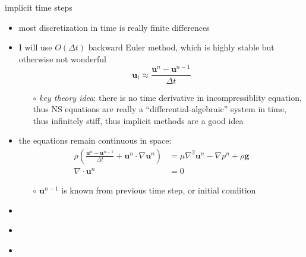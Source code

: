 \documentclass[10pt,hyperref]{beamer}
\newcommand{\bg}{\mathbf{g}}
\newcommand{\bu}{\mathbf{u}}
\newcommand{\grad}{\nabla}
\newcommand{\Div}{\nabla\cdot}
\begin{document}
\begin{frame}{implicit time steps}

\begin{itemize}
\item most discretization in time is really finite differences
\item I will use $O(\Delta t)$ backward Euler method, which is highly stable but otherwise not wonderful
	$$\bu_t \approx \frac{\bu^{n} - \bu^{n-1}}{\Delta t}$$
    \begin{itemize}
    \item[$\circ$] \emph{key theory idea}: there is no time derivative in incompressiblity equation, thus NS equations are really a ``differential-algebraic'' system in time, thus infinitely stiff, thus implicit methods are a good idea
    \end{itemize}
\item the equations remain continuous in space:
\begin{align*}
\rho\left(\frac{\bu^{n} - \bu^{n-1}}{\Delta t} + \bu^n \cdot \grad \bu^n\right) &= \mu \grad^2 \bu^n - \grad p^n + \rho \bg \\
\Div \bu^n &= 0
\end{align*}

    \begin{itemize}
    \item[$\circ$] $\bu^{n-1}$ is known from previous time step, or initial condition
    \end{itemize}
\end{itemize}
\end{frame}


\begin{frame}{}

\begin{itemize}
\item 
\end{itemize}
\end{frame}


\begin{frame}{}

\begin{itemize}
\item 
\end{itemize}
\end{frame}


\begin{frame}{}

\begin{itemize}
\item 
\end{itemize}
\end{frame}
\end{document}
